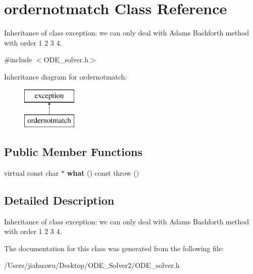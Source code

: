 \hypertarget{classordernotmatch}{}\section{ordernotmatch Class Reference}
\label{classordernotmatch}


Inheritance of class exception\+: we can only deal with Adams Bashforth method with order 1 2 3 4.  




{\ttfamily \#include $<$O\+D\+E\+\_\+solver.\+h$>$}

Inheritance diagram for ordernotmatch\+:\begin{figure}[H]
\begin{center}
\leavevmode
\includegraphics[height=2.000000cm]{classordernotmatch}
\end{center}
\end{figure}
\subsection*{Public Member Functions}
\begin{DoxyCompactItemize}
\item 
\mbox{\label{classordernotmatch_a3cd5dc7766d282739bcaa67a544b42cb}} 
virtual const char $\ast$ {\bfseries what} () const  throw ()
\end{DoxyCompactItemize}


\subsection{Detailed Description}
Inheritance of class exception\+: we can only deal with Adams Bashforth method with order 1 2 3 4. 

The documentation for this class was generated from the following file\+:\begin{DoxyCompactItemize}
\item 
/\+Users/jiahuawu/\+Desktop/\+O\+D\+E\+\_\+\+Solver2/O\+D\+E\+\_\+solver.\+h\end{DoxyCompactItemize}

